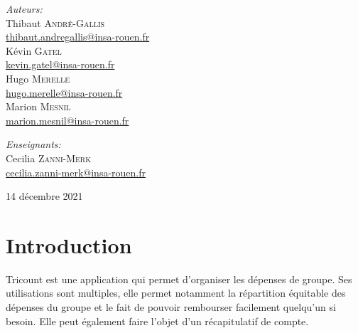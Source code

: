\documentclass[12,french]{report}
\begin{document}
\begin{titlepage}
\begin{center}
	\begin{minipage}{0.4\textwidth}
		\begin{flushleft} \large
			\emph{Auteurs:}\\
			Thibaut \textsc{André-Gallis} \\
			{\small\href{mailto:thibaut.andregallis@insa-rouen.fr}{thibaut.andregallis@insa-rouen.fr}} \\
			Kévin \textsc{Gatel} \\
			{\small\href{mailto:kevin.gatel@insa-rouen.fr}{kevin.gatel@insa-rouen.fr}}\\
			Hugo \textsc{Merelle} \\
			{\small\href{mailto:hugo.merelle@insa-rouen.fr}{hugo.merelle@insa-rouen.fr}}\\
			Marion \textsc{Mesnil} \\
			{\small\href{mailto:marion.mesnil@insa-rouen.fr}{marion.mesnil@insa-rouen.fr}}\\
		\end{flushleft}
	\end{minipage}
	\begin{minipage}{0.4\textwidth}
		\begin{flushright} \large
			\emph{Enseignants:} \\
			Cecilia \textsc{Zanni-Merk} \\
			{\small\href{mailto:cecilia.zanni-merk@insa-rouen.fr}								{cecilia.zanni-merk@insa-rouen.fr}}\\
		\end{flushright}
	\end{minipage}

	\vfill
	{\large 14 décembre 2021}
\end{center}
\end{titlepage}

\tableofcontents
\listoffigures

\renewcommand{\chaptername}{}
\chapter*{Introduction}

Tricount est une application qui permet d'organiser les dépenses de groupe. Ses utilisations sont multiples, elle permet notamment la répartition équitable des dépenses du groupe et le fait de pouvoir rembourser facilement quelqu'un si besoin. Elle peut également faire l’objet d’un récapitulatif de compte.\\
\end{document}
